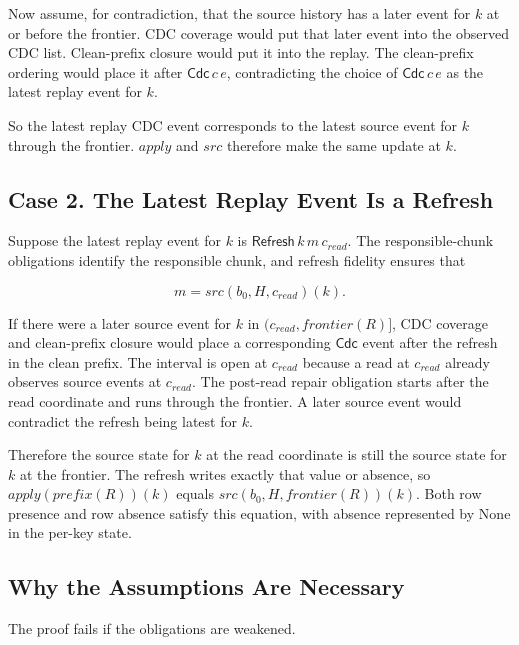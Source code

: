 \documentclass[letterpaper,10pt,twocolumn]{article}
\newcommand{\Apply}{\mathit{apply}}
\newcommand{\Src}{\mathit{src}}
\newcommand{\Frontier}{\mathit{frontier}}
\newcommand{\CleanPrefix}{\mathit{prefix}}
\newcommand{\None}{\mathrm{None}}
\begin{document}
Now assume, for contradiction, that the source history has a later event
for $k$ at or before the frontier. CDC coverage would put that
later event into the observed CDC list. Clean-prefix closure would put
it into the replay. The clean-prefix ordering would place it after
$\mathsf{Cdc}\,c\,e$, contradicting the choice of $\mathsf{Cdc}\,c\,e$ as
the latest replay event for $k$.

So the latest replay CDC event corresponds to the latest source event
for $k$ through the frontier. $\Apply$ and $\Src$
therefore make the same update at $k$.

\subsection{Case 2. The Latest Replay Event Is a
Refresh}\label{case-2-the-latest-replay-event-is-a-refresh}

Suppose the latest replay event for $k$ is
$\mathsf{Refresh}\,k\,m\,c_{\mathit{read}}$. The responsible-chunk obligations
identify the responsible chunk, and refresh fidelity ensures that

\[
m = \Src(b_0,H,c_{\mathit{read}})(k).
\]

If there were a later source event for $k$ in
$(c_{\mathit{read}}, \Frontier(R)]$, CDC coverage and clean-prefix
closure would place a corresponding $\mathsf{Cdc}$ event after the refresh
in the clean prefix. The interval is open at $c_{\mathit{read}}$ because a
read at $c_{\mathit{read}}$ already observes source events at
$c_{\mathit{read}}$. The post-read repair obligation starts after the read
coordinate and runs through the frontier. A later source event would
contradict the refresh being latest for $k$.

Therefore the source state for $k$ at the read coordinate is
still the source state for $k$ at the frontier. The refresh
writes exactly that value or absence, so
$\Apply(\CleanPrefix(R))(k)$ equals
$\Src(b_0,H,\Frontier(R))(k)$. Both row presence and row absence
satisfy this equation, with absence represented by $\None$ in the
per-key state.

\subsection{Why the Assumptions Are
Necessary}\label{sec:assumption-necessity}

The proof fails if the obligations are weakened.
\end{document}
